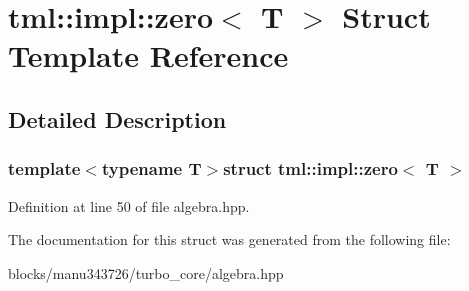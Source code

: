 \hypertarget{structtml_1_1impl_1_1zero}{\section{tml\+:\+:impl\+:\+:zero$<$ T $>$ Struct Template Reference}
\label{structtml_1_1impl_1_1zero}
}


\subsection{Detailed Description}
\subsubsection*{template$<$typename T$>$struct tml\+::impl\+::zero$<$ T $>$}



Definition at line 50 of file algebra.\+hpp.



The documentation for this struct was generated from the following file\+:\begin{DoxyCompactItemize}
\item 
blocks/manu343726/turbo\+\_\+core/algebra.\+hpp\end{DoxyCompactItemize}
